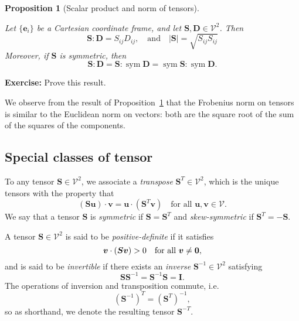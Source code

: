 \documentclass[
  letterpaper,
  DIV=11,
  numbers=noendperiod]{scrreprt}
\theoremstyle{plain}
\newtheorem{proposition}{Proposition}[chapter]
\theoremstyle{remark}
\begin{document}
\begin{proposition}[Scalar product and norm of
tensors]\protect\hypertarget{prp-scalarproduct2ndorder}{}\label{prp-scalarproduct2ndorder}

Let \(\{{\boldsymbol{e}}_i\}\) be a Cartesian coordinate frame, and let
\({\boldsymbol{S}},{\boldsymbol{D}}\in{\mathcal{V}}^2\). Then \[
{\boldsymbol{S}}:{\boldsymbol{D}}= S_{ij}D_{ij},\quad\text{and}\quad
|{\boldsymbol{S}}| = \sqrt{S_{ij}S_{ij}}
\] Moreover, if \({\boldsymbol{S}}\) is symmetric, then
\[{\boldsymbol{S}}:{\boldsymbol{D}}= {\boldsymbol{S}}:{\operatorname{sym}}{\boldsymbol{D}}= {\operatorname{sym}}{\boldsymbol{S}}:{\operatorname{sym}}{\boldsymbol{D}}.\]

\end{proposition}

\textbf{Exercise:} Prove this result.

We observe from the result of
Proposition~\ref{prp-scalarproduct2ndorder} that the Frobenius norm on
tensors is similar to the Euclidean norm on vectors: both are the square
root of the sum of the squares of the components.

\subsection{Special classes of tensor}\label{special-classes-of-tensor}

To any tensor \({\boldsymbol{S}}\in{\mathcal{V}}^2\), we associate a
\emph{transpose} \({\boldsymbol{S}}^T\in{\mathcal{V}}^2\), which is the
unique tensors with the property that
\[({\boldsymbol{S}}{\boldsymbol{u}}) \cdot {\boldsymbol{v}}= {\boldsymbol{u}}\cdot ({\boldsymbol{S}}^T{\boldsymbol{v}})\quad\text{for all }{\boldsymbol{u}},{\boldsymbol{v}}\in{\mathcal{V}}.\]
We say that a tensor \({\boldsymbol{S}}\) is \emph{symmetric} if
\({\boldsymbol{S}}= {\boldsymbol{S}}^T\) and \emph{skew-symmetric} if
\({\boldsymbol{S}}^T = -{\boldsymbol{S}}\).

A tensor \({\boldsymbol{S}}\in{\mathcal{V}}^2\) is said to be
\emph{positive-definite} if it satisfies
\[{\boldsymbol{v}}\cdot ({\boldsymbol{S}}{\boldsymbol{v}})>0\quad\text{for all }{\boldsymbol{v}}\neq\bf0,\]
and is said to be \emph{invertible} if there exists an \emph{inverse}
\({\boldsymbol{S}}^{-1}\in{\mathcal{V}}^2\) satisfying
\[{\boldsymbol{S}}{\boldsymbol{S}}^{-1} = {\boldsymbol{S}}^{-1}{\boldsymbol{S}}= {\boldsymbol{I}}.\]
The operations of inversion and transposition commute,
i.e.~\[({\boldsymbol{S}}^{-1})^T = ({\boldsymbol{S}}^T)^{-1},\] so as
shorthand, we denote the resulting tensor \({\boldsymbol{S}}^{-T}\).
\end{document}
